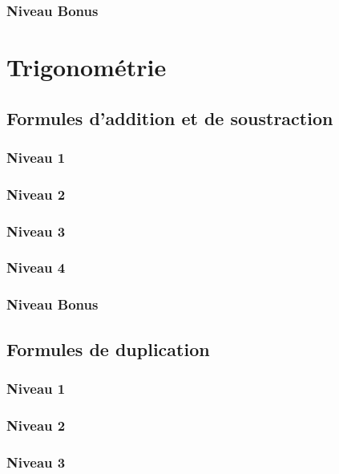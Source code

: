 \documentclass[a4paper]{report}
\begin{document}
			\subsection{Niveau Bonus}
	
	\chapter{Trigonométrie}
	
		\section{Formules d'addition et de soustraction}
		
			\subsection{Niveau 1}
		
			\subsection{Niveau 2}
		
			\subsection{Niveau 3}
			
			\subsection{Niveau 4}
			
			\subsection{Niveau Bonus}
		
		\section{Formules de duplication}
		
			\subsection{Niveau 1}
		
			\subsection{Niveau 2}
		
			\subsection{Niveau 3}
			
\end{document}

